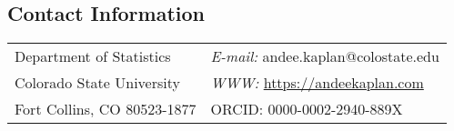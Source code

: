 \documentclass[margin,line]{res}
\begin{document}
\nocite{*}

\begin{resume}

\section{\sc Contact Information}
\vspace{.05in}
\begin{tabular}{@{}p{2in}p{4in}}
Department of Statistics  & {\it E-mail:} andee.kaplan@colostate.edu\\
Colorado State University &  {\it WWW:} \url{https://andeekaplan.com} \\
Fort Collins, CO 80523-1877 & ORCID: 0000-0002-2940-889X\\
\end{tabular}


\end{resume}
\end{document}
